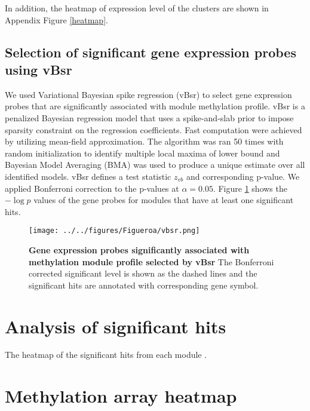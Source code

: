 \documentclass{article}
\begin{document}
In addition, the heatmap of expression level of the clusters are shown in Appendix Figure \ref{heatmap}.

\clearpage

\subsection{Selection of significant gene expression probes using vBsr}
We used Variational Bayesian spike regression (vBsr) \cite{logsdon2012novel} to select gene expression probes that are significantly associated with module methylation profile. vBsr is a penalized Bayesian regression model that uses a spike-and-slab prior to impose sparsity constraint on the regression coefficients. Fast computation were achieved by utilizing mean-field approximation. The algorithm was ran 50 times with random initialization to identify multiple local maxima of lower bound and Bayesian Model Averaging (BMA) was used to produce a unique estimate over all identified models. vBsr defines a test statistic $z_{vb}$ and corresponding p-value. We applied Bonferroni correction to the p-values at $\alpha = 0.05$. Figure \ref{vbsr} shows the $-\log p$ values of the gene probes for modules that have at least one significant hits.

\begin{figure}[htbp]
\begin{center}
\texttt{[image: ../../figures/Figueroa/vbsr.png]}
\caption[Gene expression probes significantly associated with methylation module profile selected by vBsr]{\textbf{Gene expression probes significantly associated with methylation module profile selected by vBsr} The Bonferroni corrected significant level is shown as the dashed lines and the significant hits are annotated with corresponding gene symbol. }
\label{vbsr}
\end{center}
\end{figure}

\clearpage

\section{Analysis of significant hits}

The heatmap of the significant hits from each module . 

\appendix

\section{Methylation array heatmap}
\end{document}
